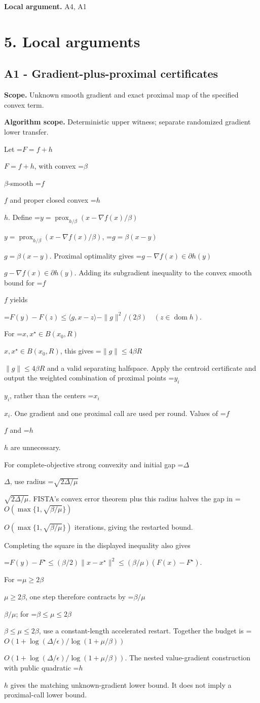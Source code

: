 \documentclass[10pt,a4paper]{article}
\newcommand{\AtlasMath}[1]{\par\begingroup\centering\setbox0=\hbox{$\displaystyle #1$}\ifdim\wd0>1.4\linewidth\typeout{ATLAS WIDE FORMULA: \the\wd0}\fi\ifdim\wd0>\linewidth\resizebox{\linewidth}{!}{\box0}\else\box0\fi\par\endgroup}
\newcommand{\AtlasInlineMath}[1]{\begingroup\setbox0=\hbox{$#1$}\ifdim\wd0>.4\linewidth\endgroup\AtlasMath{#1}\else\endgroup$#1$\fi}
\begin{document}
\textbf{Local argument.} A4, A1

\section{5. Local arguments}
\subsection{A1 - Gradient-plus-proximal certificates}
\textbf{Scope.} Unknown smooth gradient and exact proximal map of the specified convex term.

\textbf{Algorithm scope.} Deterministic upper witness; separate randomized gradient lower transfer.

Let \AtlasInlineMath{F=f+h}, with convex \AtlasInlineMath{\beta}-smooth \AtlasInlineMath{f} and proper closed convex \AtlasInlineMath{h}. Define
\AtlasInlineMath{y=\operatorname{prox}_{h/\beta}(x-\nabla f(x)/\beta)}, \AtlasInlineMath{g=\beta(x-y)}.
Proximal optimality gives \AtlasInlineMath{g-\nabla f(x)\in\partial h(y)}. Adding its subgradient inequality to the convex smooth bound for \AtlasInlineMath{f} yields

\AtlasMath{F(y)-F(z)\le\langle g,x-z\rangle-\|g\|^2/(2\beta)
\quad(z\in\operatorname{dom}h).}

For \AtlasInlineMath{x,x^\star\in B(x_0,R)}, this gives \AtlasInlineMath{\|g\|\le4\beta R} and a valid separating halfspace. Apply the centroid certificate and output the weighted combination of proximal points \AtlasInlineMath{y_i}, rather than the centers \AtlasInlineMath{x_i}. One gradient and one proximal call are used per round. Values of \AtlasInlineMath{f} and \AtlasInlineMath{h} are unnecessary.

For complete-objective strong convexity and initial gap \AtlasInlineMath{\Delta}, use radius \AtlasInlineMath{\sqrt{2\Delta/\mu}}. FISTA's convex error theorem plus this radius halves the gap in \AtlasInlineMath{O(\max\{1,\sqrt{\beta/\mu}\})} iterations, giving the restarted bound.

Completing the square in the displayed inequality also gives

\AtlasMath{F(y)-F^\star\le(\beta/2)\|x-x^\star\|^2
\le(\beta/\mu)(F(x)-F^\star).}

For \AtlasInlineMath{\mu\ge2\beta}, one step therefore contracts by \AtlasInlineMath{\beta/\mu}; for \AtlasInlineMath{\beta\le\mu\le2\beta}, use a constant-length accelerated restart. Together the budget is
\AtlasInlineMath{O(1+\log(\Delta/\epsilon)/\log(1+\mu/\beta))}.
The nested value-gradient construction with public quadratic \AtlasInlineMath{h} gives the matching unknown-gradient lower bound. It does not imply a proximal-call lower bound.
\end{document}
